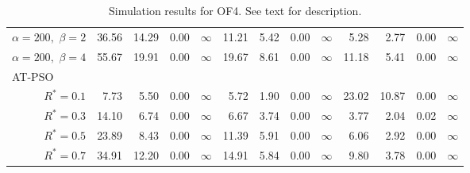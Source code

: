 \documentclass[12pt]{article}
\begin{document}
\begin{table}[ht]
{\begin{tabular}{r|rrrr|rrrr|rrrr}
  $\alpha = 200,$ $\beta =2$ & 36.56 & 14.29 & 0.00 & $\infty$ & 11.21 & 5.42 & 0.00 & $\infty$ & 5.28 & 2.77 & 0.00 & $\infty$ \\ 
  $\alpha = 200,$ $\beta =4$ & 55.67 & 19.91 & 0.00 & $\infty$ & 19.67 & 8.61 & 0.00 & $\infty$ & 11.18 & 5.41 & 0.00 & $\infty$ \\ 
\hline
\multicolumn{1}{l|}{AT-PSO} &&&&&&&&&&&&\\
  $R^* = 0.1$ & 7.73 & 5.50 & 0.00 & $\infty$ & 5.72 & 1.90 & 0.00 & $\infty$ & 23.02 & 10.87 & 0.00 & $\infty$ \\ 
  $R^* = 0.3$ & 14.10 & 6.74 & 0.00 & $\infty$ & 6.67 & 3.74 & 0.00 & $\infty$ & 3.77 & 2.04 & 0.02 & $\infty$ \\ 
  $R^* = 0.5$ & 23.89 & 8.43 & 0.00 & $\infty$ & 11.39 & 5.91 & 0.00 & $\infty$ & 6.06 & 2.92 & 0.00 & $\infty$ \\ 
  $R^* = 0.7$ & 34.91 & 12.20 & 0.00 & $\infty$ & 14.91 & 5.84 & 0.00 & $\infty$ & 9.80 & 3.78 & 0.00 & $\infty$ \\ 
   \hline
\end{tabular}
}
\caption{Simulation results for OF4. See text for description.}
\label{tab:psosim4}
\end{table}
\end{document}
